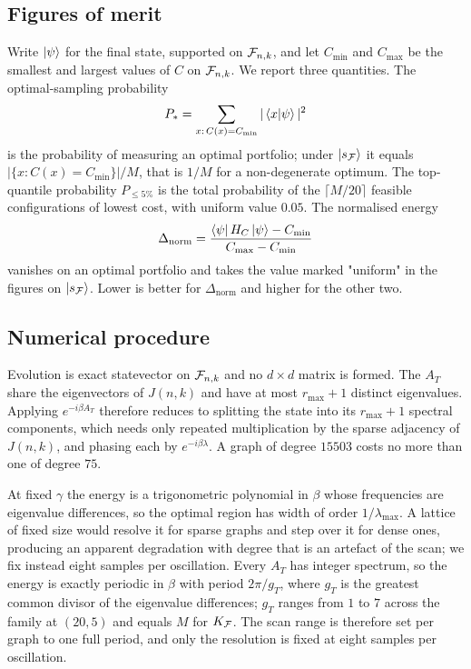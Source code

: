 \subsection{\label{sec:metrics}Figures of merit}
Write $\ket{\psi}$ for the final state, supported on $\mathcal{F}_{n,k}$, and let $C_{\min}$ and $C_{\max}$ be the smallest and largest values of $C$ on $\mathcal{F}_{n,k}$. We report three quantities. The optimal-sampling probability
\begin{equation}
P_*=\sum_{x:\,C(x)=C_{\min}}|\braket{x}{\psi}|^{2}
    \label{eq:metric-popt}
\end{equation}
is the probability of measuring an optimal portfolio; under $\ket{s_{\mathcal{F}}}$ it equals $|\{x:C(x)=C_{\min}\}|/M$, that is $1/M$ for a non-degenerate optimum. The top-quantile probability $P_{\le5\%}$ is the total probability of the $\lceil M/20\rceil$ feasible configurations of lowest cost, with uniform value $0.05$. The normalised energy
\begin{equation}
\Delta_{\mathrm{norm}} =\frac{\bra{\psi}H_C\ket{\psi}-C_{\min}}{C_{\max}-C_{\min}}
    \label{eq:metric-delta}
\end{equation}
vanishes on an optimal portfolio and takes the value marked "uniform" in the figures on $\ket{s_{\mathcal{F}}}$. Lower is better for $\Delta_{\mathrm{norm}}$ and higher for the other two.

\subsection{\label{sec:numerics}Numerical procedure}
Evolution is exact statevector on $\mathcal{F}_{n,k}$ and no $d\times d$ matrix is formed. The $A_T$ share the eigenvectors of $J(n,k)$ and have at most $r_{\max}+1$ distinct eigenvalues. Applying $e^{-i\beta A_T}$ therefore reduces to splitting the state into its $r_{\max}+1$ spectral components, which needs only repeated multiplication by the sparse adjacency of $J(n,k)$, and phasing each by $e^{-i\beta\lambda}$. A graph of degree $15503$ costs no more than one of degree $75$.

At fixed $\gamma$ the energy is a trigonometric polynomial in $\beta$ whose frequencies are eigenvalue differences, so the optimal region has width of order $1/\lambda_{\max}$. A lattice of fixed size would resolve it for sparse graphs and step over it for dense ones, producing an apparent degradation with degree that is an artefact of the scan; we fix instead eight samples per oscillation. Every $A_T$ has integer spectrum, so the energy is exactly periodic in $\beta$ with period $2\pi/g_T$, where $g_T$ is the greatest common divisor of the eigenvalue differences; $g_T$ ranges from $1$ to $7$ across the family at $(20,5)$ and equals $M$ for $K_{\mathcal{F}}$. The scan range is therefore set per graph to one full period, and only the resolution is fixed at eight samples per oscillation.

